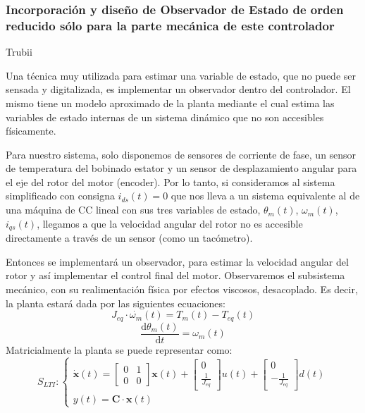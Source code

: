 \documentclass[10pt]{article}
\begin{document}
\subsubsection{Incorporación y diseño de Observador de Estado de orden reducido sólo para la parte mecánica de este controlador}
Trubii
\par
Una técnica muy utilizada para estimar una variable de estado, que no puede ser sensada y digitalizada, es implementar un observador dentro del controlador. El mismo tiene un modelo aproximado de la planta mediante el cual estima las variables de estado internas de un sistema dinámico que no son accesibles físicamente.
\par
Para nuestro sistema, solo disponemos de sensores de corriente de fase, un sensor de temperatura del bobinado estator y un sensor de desplazamiento angular para el eje del rotor del motor (encoder).
Por lo tanto, si consideramos al sistema simplificado con consigna $i_{ds}(t) = 0$ que nos lleva a un sistema equivalente al de una máquina de CC lineal con sus tres variables de estado, $\theta_m(t)$, $\omega_m(t)$, $i_{qs}(t)$, llegamos a que la velocidad angular del rotor no es accesible directamente a través de un sensor (como un tacómetro).
\par
Entonces se implementará un observador, para estimar la velocidad angular del rotor y así implementar el control final del motor.
Observaremos el subsistema mecánico, con su realimentación física por efectos viscosos, desacoplado.
Es decir, la planta estará dada por las siguientes ecuaciones:
\begin{equation}
	J_{eq}\cdot \dot{\omega_m}(t) = T_m(t) − T_{eq}(t)
\end{equation}
\begin{equation}
	\frac{\mathrm{d} \theta_m(t)}{\mathrm{d} t}=\omega_m(t)
\end{equation}
Matricialmente la planta se puede representar como:
\begin{equation}
	S_{LTI}:
	\begin{cases}
		\dot{\textbf{x}}(t) = 
		\begin{bmatrix}
		0 & 1 \\ 
		0 & 0
		\end{bmatrix} \textbf{x}(t) + 
		\begin{bmatrix}
			0  \\ 
			\frac{1}{J_{eq}} 
		\end{bmatrix}
		u(t) + 
		\begin{bmatrix}
			0  \\ 
			-\frac{1}{J_{eq}} 
		\end{bmatrix}
		d(t)
		\\
		y(t)= \textbf{C}\cdot \textbf{x}(t)
	\end{cases}
\end{equation}
\end{document}
